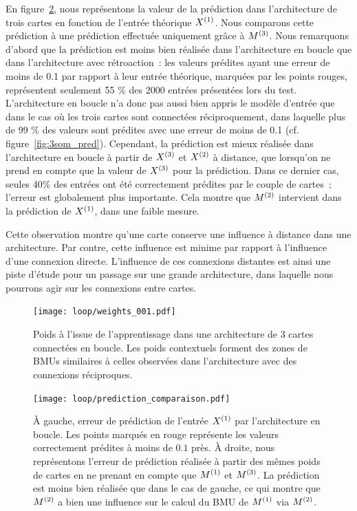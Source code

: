 \documentclass[../main]{subfiles}
\begin{document}
En figure~\ref{fig:pred_loop}, nous représentons la valeur de la prédiction dans l'architecture de trois cartes en fonction de l'entrée théorique $X^{({1})}$. Nous comparons cette prédiction à une prédiction effectuée uniquement grâce à $M^{({3})}$.
Nous remarquons d'abord que la prédiction est moins bien réalisée dans l'architecture en boucle que dans l'architecture avec rétroaction~: les valeurs prédites ayant une erreur de moins de 0.1 par rapport à leur entrée théorique, marquées par les points rouges, représentent seulement 55 \% des 2000 entrées présentées lors du test.
L'architecture en boucle n'a donc pas aussi bien appris le modèle d'entrée que dans le cas où les trois cartes sont connectées réciproquement, dans laquelle plus de 99 \% des valeurs sont prédites avec une erreur de moins de 0.1 (cf. figure~\ref{fig:3som_pred}).
Cependant, la prédiction est mieux réalisée dans l'architecture en boucle à partir de $X^{({3})}$ et $X^{({2})}$ à distance, que lorsqu'on ne prend en compte que la valeur de $X^{({3})}$ pour la prédiction. 
Dans ce dernier cas, seules 40\% des entrées ont été correctement prédites par le couple de cartes~; l'erreur est globalement plus importante.
Cela montre que $M^{({2})}$ intervient dans la prédiction de $X^{({1})}$, dans une faible mesure.

Cette observation montre qu'une carte conserve une influence à distance dans une architecture. 
Par contre, cette influence est minime par rapport à l'influence d'une connexion directe.
L'influence de ces connexions distantes est ainsi une piste d'étude pour un passage sur une grande architecture, dans laquelle nous pourrons agir sur les connexions entre cartes.

\begin{figure}[h!]
		\centering\texttt{[image: loop/weights\_001.pdf]}
		\caption{Poids à l'issue de l'apprentissage dans une architecture de 3 cartes connectées en boucle. Les poids contextuels forment des zones de BMUs similaires à celles observées dans l'architecture avec des connexions réciproques.\label{fig:3som_loop}}
\end{figure}

\begin{figure}[h!]
	\centering\texttt{[image: loop/prediction\_comparaison.pdf]}
	\caption{\`A gauche, erreur de prédiction de l'entrée $X^{({1})}$ par l'architecture en boucle. Les points marqués en rouge représente les valeurs correctement prédites à moins de $0.1$ près. 
	\`A droite, nous représentons l'erreur de prédiction réalisée à partir des mêmes poids de cartes en ne prenant en compte que $M^{({1})}$ et $M^{({3})}$. La prédiction est moins bien réalisée que dans le cas de gauche, ce qui montre que $M^{({2})}$ a bien une influence sur le calcul du BMU de $M^{({1})}$ via $M^{({2})}$.
	\label{fig:pred_loop}}
\end{figure}
\end{document}

